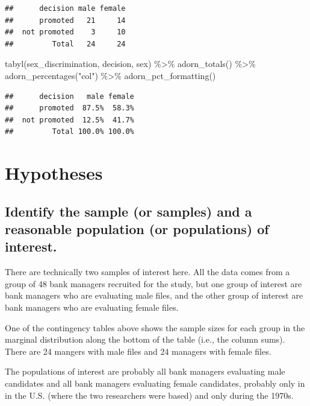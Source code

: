 \documentclass[
]{book}
\newenvironment{Shaded}{\begin{snugshade}}{\end{snugshade}}
\newcommand{\FunctionTok}[1]{\textcolor[rgb]{0.00,0.00,0.00}{#1}}
\newcommand{\NormalTok}[1]{#1}
\newcommand{\SpecialCharTok}[1]{\textcolor[rgb]{0.00,0.00,0.00}{#1}}
\newcommand{\StringTok}[1]{\textcolor[rgb]{0.31,0.60,0.02}{#1}}
\begin{document}
\begin{verbatim}
##      decision male female
##      promoted   21     14
##  not promoted    3     10
##         Total   24     24
\end{verbatim}

\begin{Shaded}
\begin{Highlighting}[]
\FunctionTok{tabyl}\NormalTok{(sex\_discrimination, decision, sex) }\SpecialCharTok{\%\textgreater{}\%}
  \FunctionTok{adorn\_totals}\NormalTok{() }\SpecialCharTok{\%\textgreater{}\%}
  \FunctionTok{adorn\_percentages}\NormalTok{(}\StringTok{"col"}\NormalTok{) }\SpecialCharTok{\%\textgreater{}\%}
  \FunctionTok{adorn\_pct\_formatting}\NormalTok{()}
\end{Highlighting}
\end{Shaded}

\begin{verbatim}
##      decision   male female
##      promoted  87.5%  58.3%
##  not promoted  12.5%  41.7%
##         Total 100.0% 100.0%
\end{verbatim}

\hypertarget{hypothesis1-ex-hypotheses}{%
\section{Hypotheses}\label{hypothesis1-ex-hypotheses}}

\hypertarget{hypothesis1-ex-sample-pop}{%
\subsection{Identify the sample (or samples) and a reasonable population (or populations) of interest.}\label{hypothesis1-ex-sample-pop}}

There are technically two samples of interest here. All the data comes from a group of 48 bank managers recruited for the study, but one group of interest are bank managers who are evaluating male files, and the other group of interest are bank managers who are evaluating female files.

One of the contingency tables above shows the sample sizes for each group in the marginal distribution along the bottom of the table (i.e., the column sums). There are 24 mangers with male files and 24 managers with female files.

The populations of interest are probably all bank managers evaluating male candidates and all bank managers evaluating female candidates, probably only in in the U.S. (where the two researchers were based) and only during the 1970s.
\end{document}

